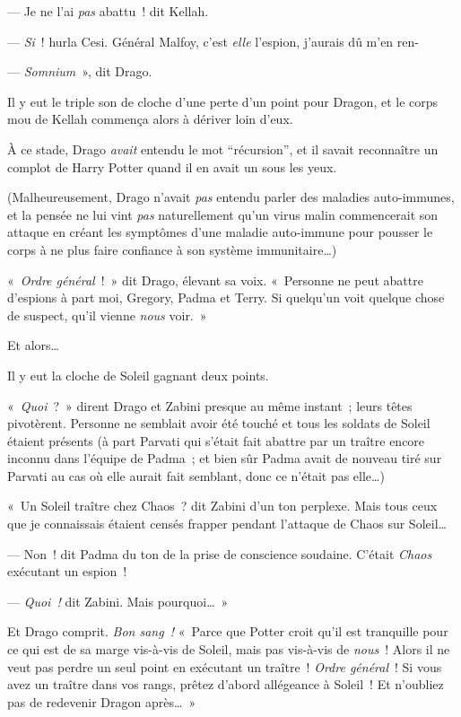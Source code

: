 --- Je ne l'ai \emph{pas} abattu~! dit Kellah.

--- \emph{Si}~! hurla Cesi.
Général Malfoy, c'est \emph{elle} l'espion, j'aurais dû m'en ren-

--- \emph{Somnium}~», dit Drago.

Il y eut le triple son de cloche d'une perte d'un point pour Dragon, et le corps mou de Kellah commença alors à dériver loin d'eux.

À ce stade, Drago \emph{avait} entendu le mot “récursion”, et il savait reconnaître un complot de Harry Potter quand il en avait un sous les yeux.

(Malheureusement, Drago n'avait \emph{pas} entendu parler des maladies auto-immunes, et la pensée ne lui vint \emph{pas} naturellement qu'un virus malin commencerait son attaque en créant les symptômes d'une maladie auto-immune pour pousser le corps à ne plus faire confiance à son système immunitaire…)

«~\emph{Ordre général}~!~»
dit Drago, élevant sa voix.
«~Personne ne peut abattre d'espions à part moi, Gregory, Padma et Terry.
Si quelqu'un voit quelque chose de suspect, qu'il vienne \emph{nous} voir.~»

Et alors…

Il y eut la cloche de Soleil gagnant deux points.

«~\emph{Quoi}~?~»
dirent Drago et Zabini presque au même instant~; leurs têtes pivotèrent.
Personne ne semblait avoir été touché et tous les soldats de Soleil étaient présents (à part Parvati qui s'était fait abattre par un traître encore inconnu dans l'équipe de Padma~; et bien sûr Padma avait de nouveau tiré sur Parvati au cas où elle aurait fait semblant, donc ce n'était pas elle…)

«~Un Soleil traître chez Chaos~? dit Zabini d'un ton perplexe.
Mais tous ceux que je connaissais étaient censés frapper pendant l'attaque de Chaos sur Soleil…

--- Non~! dit Padma du ton de la prise de conscience soudaine.
C'était \emph{Chaos} exécutant un espion~!

--- \emph{Quoi~!} dit Zabini.
Mais pourquoi…~»

Et Drago comprit.
\emph{Bon sang~!} «~Parce que Potter croit qu'il est tranquille pour ce qui est de sa marge vis-à-vis de Soleil, mais pas vis-à-vis de \emph{nous}~!
Alors il ne veut pas perdre un seul point en exécutant un traître~!
\emph{Ordre général}~!
Si vous avez un traître dans vos rangs, prêtez d'abord allégeance à Soleil~!
Et n'oubliez pas de redevenir Dragon après…~»

